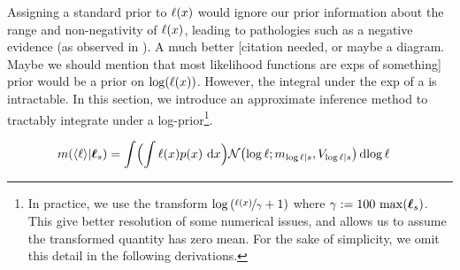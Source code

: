 \documentclass{article}
\begin{document}
Assigning a standard \gpb prior to $\lfn(\lfv)$ would ignore our prior information about the range and non-negativity of $\lfn(\lfv)$, leading to pathologies such as a negative evidence (as observed in \citep{BZMonteCarlo}).  A much better [citation needed, or maybe a diagram.  Maybe we should mention that most likelihood functions are exps of something] prior would be a \gpb prior on $\log(\lfn(x))$.  However, the integral under the exp of a \gpb is intractable.  In this section, we introduce an approximate inference method to tractably integrate under a log-\gpb prior\footnote{In practice, we use the transform 
$\log\left(\nicefrac{\lfn(\lfv)}{\gamma} + 1\right)$
where $\gamma \deq 100\, \max(\vr_s)$.  This give better resolution of some numerical issues, and allows us to assume the transformed quantity has zero mean. For the sake of simplicity, we omit this detail in the following derivations.}.

%
%
%
\begin{align}
\mean{\inty{\lfn}}{\vr_s}
&  =\int \Bigl( \int \lfn(\lfv)\po{\lfv}\,\ud\lfv\Bigr)
\N{\tr}{\meancondfn{\tr}{s}}{\covcondfn{\tr}{s}} \ud \tr \nonumber
\end{align}
\end{document}
